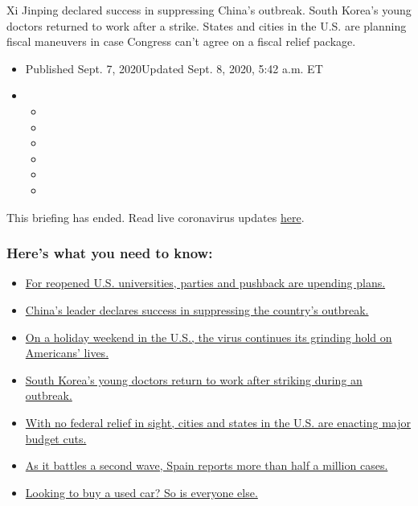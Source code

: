 Xi Jinping declared success in suppressing China's outbreak. South
Korea's young doctors returned to work after a strike. States and cities
in the U.S. are planning fiscal maneuvers in case Congress can't agree
on a fiscal relief package.

\begin{itemize}
\item
  Published Sept. 7, 2020Updated Sept. 8, 2020, 5:42 a.m. ET
\item
  \begin{itemize}
  \item
  \item
  \item
  \item
  \item
  \item
  \end{itemize}
\end{itemize}

This briefing has ended. Read live coronavirus updates
\href{https://www.nytimes3xbfgragh.onion/2020/09/08/world/covid-19-coronavirus.html}{here}.

\hypertarget{heres-what-you-need-to-know}{%
\subsubsection{Here's what you need to
know:}\label{heres-what-you-need-to-know}}

\begin{itemize}
\tightlist
\item
  \protect\hyperlink{link-71fba04f}{For reopened U.S. universities,
  parties and pushback are upending plans.}
\item
  \protect\hyperlink{link-adc17f7}{China's leader declares success in
  suppressing the country's outbreak.}
\item
  \protect\hyperlink{link-47c32b10}{On a holiday weekend in the U.S.,
  the virus continues its grinding hold on Americans' lives.}
\item
  \protect\hyperlink{link-1b6abf8f}{South Korea's young doctors return
  to work after striking during an outbreak.}
\item
  \protect\hyperlink{link-2448efdc}{With no federal relief in sight,
  cities and states in the U.S. are enacting major budget cuts.}
\item
  \protect\hyperlink{link-f62aa98}{As it battles a second wave, Spain
  reports more than half a million cases.}
\item
  \protect\hyperlink{link-5d176734}{Looking to buy a used car? So is
  everyone else.}
\end{itemize}

